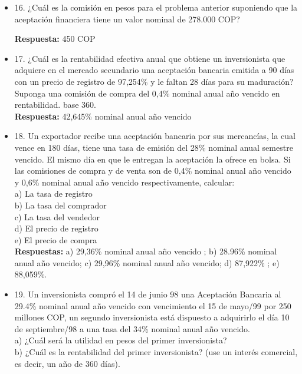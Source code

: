 \begin{itemize}
       \textbf{Respuestas:} $i_{c}$ = 34\% nominal anual año vencido; $P_{c}$ = 86,37\%\\
       \medskip

 \item 16. ¿Cuál es la comisión en pesos para el problema anterior suponiendo que la aceptación financiera tiene un valor nominal de 278.000 COP?
 
       \textbf{Respuesta:} 450 COP\\
       \medskip

 \item 17. ¿Cuál es la rentabilidad efectiva anual que obtiene un inversionista que adquiere en el mercado secundario una aceptación bancaria emitida a 90 días con un precio de registro de 97,254\% y le faltan 28 días para su maduración? Suponga una comisión de compra del 0,4\% nominal anual año vencido en rentabilidad. base 360.\\
       \textbf{Respuesta:} 42,645\% nominal anual año vencido\\
       \medskip

 \item 18. Un exportador recibe una aceptación bancaria por sus mercancías, la cual vence en 180 días, tiene una tasa de emisión del 28\% nominal anual semestre vencido. El mismo día en que le entregan la aceptación la ofrece en bolsa. Si las comisiones de compra y de venta son de 0,4\% nominal anual año vencido y 0,6\% nominal anual año vencido respectivamente, calcular:\\
       a) La tasa de registro\\
       b) La tasa del comprador\\
       c) La tasa del vendedor\\
       d) El precio de registro\\
       e) El precio de compra\\
       \textbf{Respuestas:} a) 29,36\% nominal anual año vencido ; b) 28.96\% nominal anual año vencido; c) 29,96\% nominal anual año vencido; d) 87,922\% ; e) 88,059\%.\\
       \medskip

 \item 19. Un inversionista compró el 14 de junio 98 una Aceptación Bancaria al 29.4\% nominal anual año vencido con vencimiento el 15 de mayo/99 por 250 millones COP, un segundo inversionista está dispuesto a adquirirlo el día 10 de septiembre/98 a una tasa del 34\% nominal anual año vencido.\\
       a) ¿Cuál será la utilidad en pesos del primer inversionista?\\
       b) ¿Cuál es la rentabilidad del primer inversionista? (use un interés comercial, es decir, un año de 360 días).
       

\end{itemize}

